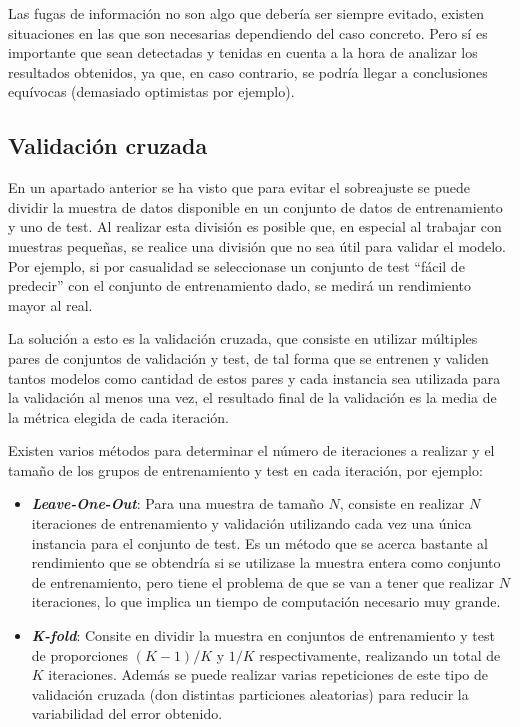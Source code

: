 Las fugas de información no son algo que debería ser siempre evitado, existen
situaciones en las que son necesarias dependiendo del caso concreto. Pero sí es
importante que sean detectadas y tenidas en cuenta a la hora de analizar los
resultados obtenidos, ya que, en caso contrario, se podría llegar a conclusiones
equívocas (demasiado optimistas por ejemplo).

\subsection{Validación cruzada}

En un apartado anterior se ha visto que para evitar el sobreajuste se puede
dividir la muestra de datos disponible en un conjunto de datos de entrenamiento
y uno de test. Al realizar esta división es posible que, en especial al trabajar
con muestras pequeñas, se realice una división que no sea útil para validar el
modelo. Por ejemplo, si por casualidad se seleccionase un conjunto de test
``fácil de predecir'' con el conjunto de entrenamiento dado, se medirá un
rendimiento mayor al real.

La solución a esto es la validación cruzada, que consiste en utilizar múltiples
pares de conjuntos de validación y test, de tal forma que se entrenen y validen
tantos modelos como cantidad de estos pares y cada instancia sea utilizada para
la validación al menos una vez, el resultado final de la validación es la media
de la métrica elegida de cada iteración.

Existen varios métodos para determinar el número de iteraciones a realizar y el
tamaño de los grupos de entrenamiento y test en cada iteración, por ejemplo:

\begin{itemize}
    \item \textbf{\textit{Leave-One-Out}}: Para una muestra de tamaño $N$,
    consiste en realizar $N$ iteraciones de entrenamiento y validación
    utilizando cada vez una única instancia para el conjunto de test. Es un
    método que se acerca bastante al rendimiento que se obtendría si se
    utilizase la muestra entera como conjunto de entrenamiento, pero tiene el
    problema de que se van a tener que realizar $N$ iteraciones, lo que implica
    un tiempo de computación necesario muy grande.
    \item \textbf{\textit{K-fold}}: Consite en dividir la muestra en conjuntos
    de entrenamiento y test de proporciones $(K-1)/K$ y $1/K$ respectivamente,
    realizando un total de $K$ iteraciones. Además se puede realizar varias
    repeticiones de este tipo de validación cruzada (don distintas particiones
    aleatorias) para reducir la variabilidad del error obtenido.
\end{itemize}

